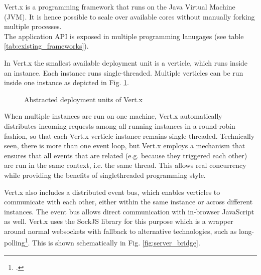 Vert.x is a programming framework that runs on the Java Virtual Machine (JVM).
It is hence possible to scale over
available cores without manually forking multiple processes.\\
The application API is exposed in multiple programming lanugages (see table
\ref{tab:existing_frameworks}).

In Vert.x the smallest available deployment unit is a verticle, which runs
inside an instance. Each instance runs single-threaded.
Multiple verticles can be run inside one instance as depicted in Fig.
\ref{fig:vertx_constructs}.

\begin{figure}[h]
	\centering
	\setlength\fboxsep{2pt}
	\caption{Abstracted deployment units of Vert.x}
	\label{fig:vertx_constructs}
\end{figure}

When multiple instances are run on one machine, Vert.x automatically distributes incoming
requests among all running instances in a round-robin fashion, so that each
Vert.x verticle instance remains single-threaded. Technically seen, there is
more than one event loop, but Vert.x employs a mechanism that ensures that all events
that are related (e.g. because they triggered each other) are run in the same context, i.e. the same thread.
This allows real concurrency while providing the benefits of singlethreaded programming style.

Vert.x also includes a distributed event bus, which enables verticles to
communicate with each other, either within the same instance or across different
instances. The event bus allows direct communication with in-browser JavaScript as well.
Vert.x uses the SockJS library for this purpose which is a wrapper around normal websockets with
fallback to alternative technologies, such as long-polling\footcite[][]{sockjs_2013}.
This is shown schematically in Fig. \ref{fig:server_bridge}.

